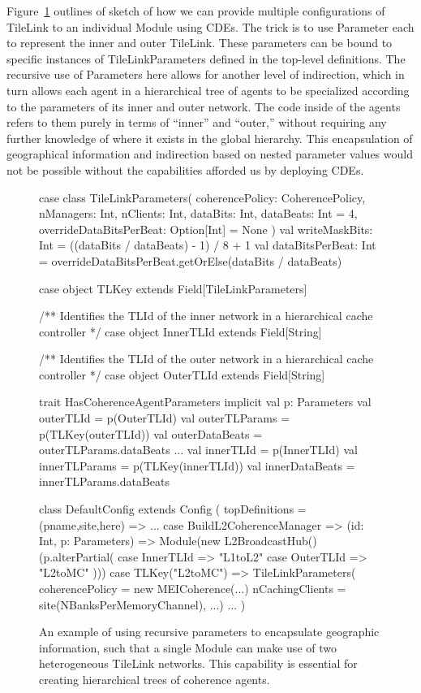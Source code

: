 Figure~\ref{fig:tlgeo} outlines of sketch of how we can provide multiple configurations of TileLink to an individual Module using CDEs.
The trick is to use Parameter each to represent the inner and outer TileLink. 
These parameters can be bound to specific instances of TileLinkParameters defined in the top-level definitions.
The recursive use of Parameters here allows for another level of indirection, which in turn allows each agent
in a hierarchical tree of agents to be specialized according to the parameters of its inner and outer network.
The code inside of the agents refers to them purely in terms of ``inner'' and ``outer,'' without
requiring any further knowledge of where it exists in the global hierarchy.
This encapsulation of geographical information and indirection based on nested parameter values would not be possible without
the capabilities afforded us by deploying CDEs.

\begin{figure}
\centering
\begin{scala}
case class TileLinkParameters(
    coherencePolicy: CoherencePolicy,
    nManagers: Int,
    nClients: Int,
    dataBits: Int,
    dataBeats: Int = 4,
    overrideDataBitsPerBeat: Option[Int] = None
    ) {
  val writeMaskBits: Int  = ((dataBits / dataBeats) - 1) / 8 + 1
  val dataBitsPerBeat: Int = overrideDataBitsPerBeat.getOrElse(dataBits / dataBeats)
}

case object TLKey extends Field[TileLinkParameters]

/** Identifies the TLId of the inner network in a hierarchical cache controller */
case object InnerTLId extends Field[String]

/** Identifies the TLId of the outer network in a hierarchical cache controller */
case object OuterTLId extends Field[String]

trait HasCoherenceAgentParameters {
  implicit val p: Parameters
  val outerTLId = p(OuterTLId)
  val outerTLParams = p(TLKey(outerTLId))
  val outerDataBeats = outerTLParams.dataBeats
  ...
  val innerTLId = p(InnerTLId)
  val innerTLParams = p(TLKey(innerTLId))
  val innerDataBeats = innerTLParams.dataBeats
}

class DefaultConfig extends Config (
  topDefinitions = { (pname,site,here) =>
    ...
      case BuildL2CoherenceManager => (id: Int, p: Parameters) =>
        Module(new L2BroadcastHub()(p.alterPartial({
          case InnerTLId => "L1toL2"
          case OuterTLId => "L2toMC" })))
      case TLKey("L2toMC") =>
        TileLinkParameters(
          coherencePolicy = new MEICoherence(...)
          nCachingClients = site(NBanksPerMemoryChannel), ...)
      ...
})

\end{scala} 
\caption{
An example of using recursive parameters to encapsulate geographic information, such that a single Module can make use of
two heterogeneous TileLink networks.
This capability is essential for creating hierarchical trees of coherence agents.
}
\label{fig:tlgeo}
\end{figure}

